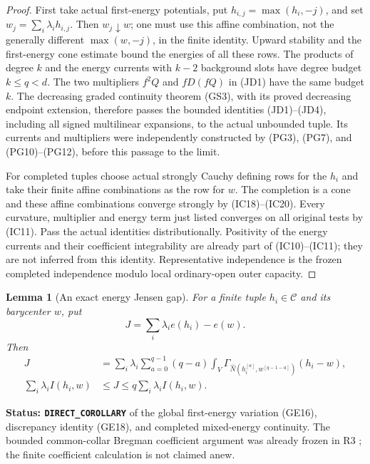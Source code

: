 \documentclass[11pt,a4paper]{article}
\numberwithin{equation}{section}
\newtheorem{lemma}[theorem]{Lemma}
\theoremstyle{definition}
\theoremstyle{remark}
\begin{document}
\begin{proof}
First take actual first-energy potentials, put
$h_{i,j}=\max(h_i,-j)$, and set
$w_j=\sum_i\lambda_i h_{i,j}$.  Then $w_j\downarrow w$; one must
use this affine combination, not the generally different
$\max(w,-j)$, in the finite identity.  Upward stability and the
first-energy cone estimate bound the energies of all these rows.
The products of degree $k$ and the energy currents with
$k-2$ background slots have degree budget $k\leq q<d$.
The two multipliers $f^2Q$ and $fD(fQ)$ in (JD1) have the same
budget $k$.  The decreasing graded continuity theorem (GS3), with
its proved decreasing endpoint extension, therefore passes the
bounded identities (JD1)--(JD4), including all signed multilinear
expansions, to the actual unbounded tuple.  Its currents and
multipliers were independently constructed by (PG3), (PG7), and
(PG10)--(PG12), before this passage to the limit.

For completed tuples choose actual strongly Cauchy defining rows
for the $h_i$ and take their finite affine combinations as the row
for $w$.  The completion is a cone and these affine combinations
converge strongly by (IC18)--(IC20).  Every curvature, multiplier
and energy term just listed converges on all original tests by
(IC11).  Pass the actual identities distributionally.  Positivity
of the energy currents and their coefficient integrability are
already part of (IC10)--(IC11); they are not inferred from this
identity.  Representative independence is the frozen completed
independence modulo local ordinary-open outer capacity.
\end{proof}

\begin{lemma}[An exact energy Jensen gap]
\label{lem:r12-energy-jensen-gap}
For a finite tuple $h_i\in\mathcal C$ and its barycenter $w$, put
\[
                       J=\sum_i\lambda_i e(h_i)-e(w).
\]
Then
\[
 \begin{split}
 J&=\sum_i\lambda_i\sum_{a=0}^{q-1}(q-a)
       \int_V\Gamma_{\widehat N(h_i^{[a]},w^{[q-1-a]})}(h_i-w),\\
 \sum_i\lambda_i I(h_i,w)&\leq J
             \leq q\sum_i\lambda_i I(h_i,w).
 \end{split}
 \tag{JD9}
\]
\end{lemma}

\noindent\textbf{Status: \texttt{DIRECT\_COROLLARY}} of the global
first-energy variation (GE16), discrepancy identity (GE18), and
completed mixed-energy continuity.  The bounded common-collar
Bregman coefficient argument was already frozen in R3
; the finite coefficient
calculation is not claimed anew.
\end{document}
